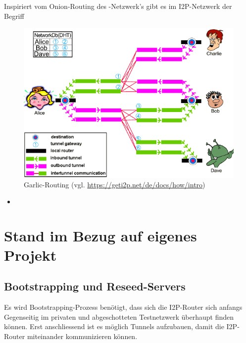 Inspiriert vom Onion-Routing des -Netzwerk's gibt es im I2P-Netzwerk der Begriff

\begin{figure}[H]
    \includegraphics[width=\textwidth]{img/i2prouting.png}
    \caption{Garlic-Routing (vgl. \url{https://geti2p.net/de/docs/how/intro})}
\end{figure}

\begin{itemize}
    \item
\end{itemize}

\cite{de_boer_invisible_2019}

\cite{noauthor_intro_nodate}



\section{Stand im Bezug auf eigenes Projekt}

\subsection{Bootstrapping und Reseed-Servers}



Es wird Bootstrapping-Prozess benötigt, dass sich die I2P-Router sich anfangs Gegenseitig im privaten und abgeschotteten Testnetzwerk überhaupt finden können.
Erst anschliessend ist es möglich Tunnels aufzubauen, damit die I2P-Router miteinander kommunizieren können.


